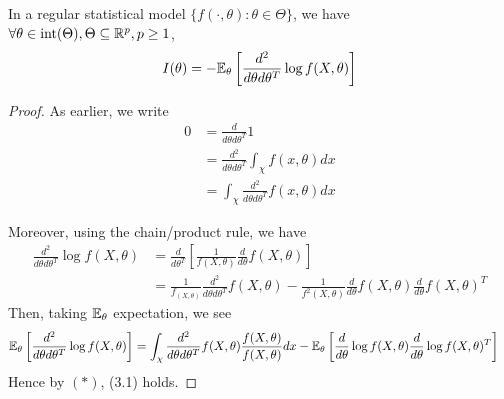 \documentclass[a4paper]{article}
\begin{document}
\begin{prop}
	In a regular statistical model $\{f(\cdot , \theta) : \theta \in \Theta\}$, we have $\forall \theta \in\operatorname{int} (\Theta), \Theta \subseteq \mathbb{R}^{p}, p\ge 1 $,
	\[
		I(\theta) = - \mathbb{E}_{\theta} \left[ \frac{d^2}{d \theta d \theta^{T}} \log f(X, \theta) \right] 
	\] 
\end{prop}

\begin{proof}
	As earlier, we write
	\begin{align*}
		0 &= \frac{d}{d \theta d \theta^{T}} 1 \\
		&= \frac{d^2}{d \theta d \theta^{T}} \int_{\chi} f(x, \theta) dx \\
		&= \int_{\chi} \frac{d^2}{d \theta d \theta^{T}} f(x, \theta) dx \tag{*}
	\end{align*}

	Moreover, using the chain/product rule, we have
	\begin{align*}
		\frac{d^2}{d\theta d\theta^{T}}\log f(X, \theta) &= \frac{d}{d \theta^{T}} \left[ \frac{1}{f(X, \theta)} \frac{d}{d\theta} f(X,\theta) \right] \\
		&= \frac{1}{f_(X,\theta)} \frac{d^2}{d\theta d\theta^{T}} f(X, \theta) - \frac{1}{f^2(X, \theta)} \frac{d}{d \theta} f(X, \theta) \frac{d}{d \theta} f(X, \theta)^{T}
	\end{align*}
	Then, taking $\mathbb{E}_{\theta}$ expectation, we see
	 \begin{align*}
		 \mathbb{E}_{\theta} \left[ \frac{d^2}{d\theta d\theta^{T}} \log f(X, \theta)\right] &= \int_{\chi} \frac{d^2}{d\theta d\theta^{T}} f(X,\theta) \frac{f(X, \theta)}{f(X,\theta)} dx - \mathbb{E}_{\theta} \left[ \frac{d}{d \theta} \log f(X, \theta) \frac{d}{d \theta} \log f(X, \theta)^{T}  \right] 
	\end{align*}
	Hence by $(*)$, (3.1) holds.
\end{proof}
\end{document}
